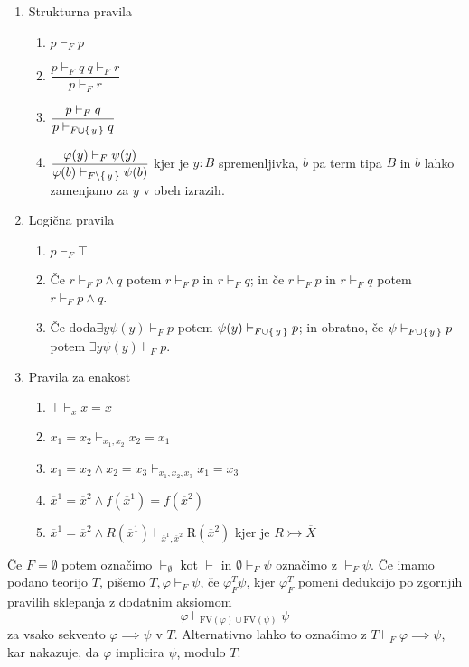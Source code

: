 \documentclass[../kategoricna_logika.tex]{subfiles}
\begin{document}
\begin{definicija}
  $ $
  \begin{enumerate}[label*=\arabic*.]
    \item Strukturna pravila
    \begin{enumerate}[label*=\arabic*.]
      \item $p \vdash_F p$
      \item $\dfrac{p \vdash_F q \ q \vdash_F r}{p \vdash_F r}$
      \item $\dfrac{p \vdash_F q}{p \vdash_{F \cup \{\,y\,\}} q}$
      \item $\dfrac{\varphi(y) \vdash_F \psi(y)}{\varphi(b) \vdash_{F\setminus\{\,y\,\}} \psi(b)}$
      kjer je $y : B$ spremenljivka, $b$ pa term tipa $B$ in $b$ lahko zamenjamo za $y$ v obeh izrazih.
    \end{enumerate}
    \item Logična pravila
    \begin{enumerate}[label*=\arabic*.]
      \item $p \vdash_F \top$
      \item Če $r \vdash_F p \wedge q$ potem $r \vdash_F p$ in $r \vdash_F q$; in če $r \vdash_F p$ in $r \vdash_F q$ potem $r \vdash_F p \wedge q$.
      \item Če doda$\exists y \psi(y) \vdash_F p$ potem $\psi(y) \vdash_{F \cup \{\,y\,\}} p$; in obratno, če $\psi \vdash_{F \cup \{\,y\,\}} p$ potem $\exists y \psi(y) \vdash_F p$.
    \end{enumerate}
    \item Pravila za enakost
    \begin{enumerate}[label*=\arabic*.]
      \item $\top \vdash_x x = x$
      \item $x_1 = x_2 \vdash_{x_1, x_2} x_2 = x_1$
      \item $x_1 = x_2 \wedge x_2 = x_3 \vdash_{x_1, x_2, x_3} x_1 = x_3$
      \item $\overline{x}^1 = \overline{x}^2 \wedge f(\overline{x}^1) = f(\overline{x}^2)$
      \item $\overline{x}^1 = \overline{x}^2 \wedge R(\overline{x}^1) \vdash_{\overline{x}^1, \overline{x}^2} \mathrm{R}(\overline{x}^2)$
      kjer je $R \rightarrowtail \overline{X}$
    \end{enumerate}
  \end{enumerate}
  Če $F = \emptyset$ potem označimo $\vdash_\emptyset$ kot $\vdash$ in $\emptyset \vdash_F \psi$ označimo z $\vdash_F \psi$.
  Če imamo podano teorijo $T$, pišemo $T, \varphi \vdash_F \psi$, če $\varphi_F^T \psi$, kjer $\varphi_F^T$ pomeni dedukcijo po zgornjih pravilih sklepanja z dodatnim aksiomom
  $$\varphi \vdash_{\mathrm{FV}(\varphi) \cup \mathrm{FV}(\psi)} \psi$$
  za vsako sekvento $\varphi \implies \psi$ v $T$. Alternativno lahko to označimo z $T \vdash_F \varphi \implies \psi$, kar nakazuje, da $\varphi$ implicira $\psi$, modulo $T$.
\end{definicija}
\begin{primer}[izpeljava]
  
\end{primer}
%
\end{document}
